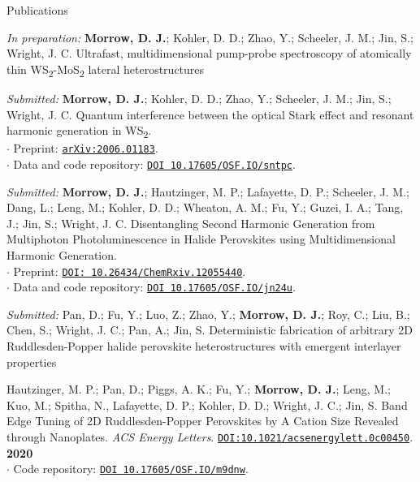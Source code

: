 \documentclass{resume} %
\begin{document}
\begin{rSection}{Publications}
	
\begin{etaremune}

	
\item[] \textit{In preparation:} \textbf{Morrow, D. J.}; Kohler, D. D.; Zhao, Y.; Scheeler, J. M.; Jin, S.; Wright, J. C. Ultrafast, multidimensional pump-probe spectroscopy of atomically thin WS\textsubscript{2}-MoS\textsubscript{2} lateral heterostructures
	

	
\item[] \textit{Submitted:} \textbf{Morrow, D. J.}; Kohler, D. D.; Zhao, Y.; Scheeler, J. M.; Jin, S.; Wright, J. C.	Quantum interference between the optical Stark effect and resonant harmonic generation in WS\textsubscript{2}.\\
$\cdot$ Preprint: \href{http://arxiv.org/abs/2006.01183}{\texttt{arXiv:2006.01183}}. \\
$\cdot$ Data and code repository: \href{https://osf.io/sntpc/}{\texttt{DOI 10.17605/OSF.IO/sntpc}}.

\item[] \textit{Submitted:} \textbf{Morrow, D. J.}; Hautzinger, M. P.; Lafayette, D. P.; Scheeler, J. M.; Dang, L.; Leng, M.; Kohler, D. D.; Wheaton, A. M.; Fu, Y.; Guzei, I. A.; Tang, J.; Jin, S.; Wright, J. C. Disentangling Second Harmonic Generation from Multiphoton Photoluminescence in Halide Perovskites using Multidimensional Harmonic Generation.\\
$\cdot$ Preprint: \href{https://dx.doi.org/10.26434/chemrxiv.12055440}{\texttt{DOI: 10.26434/ChemRxiv.12055440}}. \\
$\cdot$ Data and code repository: \href{https://osf.io/jn24u/}{\texttt{DOI 10.17605/OSF.IO/jn24u}}.


\item[] \textit{Submitted:} Pan, D.; Fu, Y.; Luo, Z.; Zhao, Y.; \textbf{Morrow, D. J.}; Roy, C.; Liu, B.; Chen, S.; Wright, J. C.; Pan, A.; Jin, S. Deterministic fabrication of arbitrary 2D Ruddlesden-Popper halide perovskite heterostructures with emergent interlayer properties

\item Hautzinger, M. P.; Pan, D.; Piggs, A. K.; Fu, Y.; \textbf{Morrow, D. J.}; Leng, M.; Kuo, M.; Spitha, N., Lafayette, D. P.; Kohler, D. D.; Wright, J. C.; Jin, S. Band Edge Tuning of 2D Ruddlesden-Popper Perovskites by A Cation Size Revealed through Nanoplates. \emph{ACS Energy Letters}. \href{https://pubs.acs.org/doi/10.1021/acsenergylett.0c00450}{\texttt{DOI:10.1021/acsenergylett.0c00450}}. \textbf{2020} \\
$\cdot$ Code repository: \href{https://osf.io/m9dnw/}{\texttt{DOI 10.17605/OSF.IO/m9dnw}}.


\end{etaremune}
\end{rSection}
\end{document}
